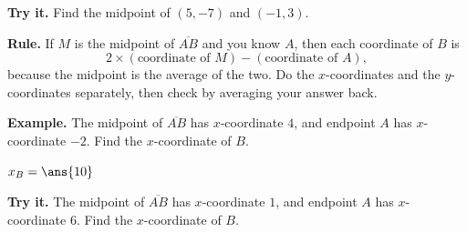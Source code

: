 \documentclass[12pt]{article}
\begin{document}
\begin{tryitbox}
\textbf{Try it.} Find the midpoint of $(5,-7)$ and $(-1,3)$.\\[2pt]
\end{tryitbox}


\begin{formulabox}
\textbf{Rule.} If $M$ is the midpoint of $\overline{AB}$ and you know $A$, then
each coordinate of $B$ is
\[ 2 \times (\text{coordinate of } M) - (\text{coordinate of } A), \]
because the midpoint is the average of the two. Do the $x$-coordinates and the
$y$-coordinates separately, then check by averaging your answer back.
\end{formulabox}

\begin{examplebox}
\textbf{Example.} The midpoint of $\overline{AB}$ has $x$-coordinate $4$, and
endpoint $A$ has $x$-coordinate $-2$. Find the $x$-coordinate of $B$.

$x_B = \ans{10}$
\end{examplebox}

\begin{tryitbox}
\textbf{Try it.} The midpoint of $\overline{AB}$ has $x$-coordinate $1$, and
endpoint $A$ has $x$-coordinate $6$. Find the $x$-coordinate of $B$.\\[2pt]
\end{tryitbox}
\end{document}
